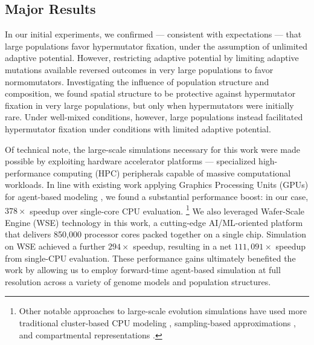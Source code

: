 \subsection{Major Results}

In our initial experiments, we confirmed --- consistent with expectations --- that large populations favor hypermutator fixation, under the assumption of unlimited adaptive potential.
However, restricting adaptive potential by limiting adaptive mutations available reversed outcomes in very large populations to favor normomutators.
Investigating the influence of population structure and composition, we found spatial structure to be protective against hypermutator fixation in very large populations, but only when hypermutators were initially rare.
Under well-mixed conditions, however, large populations instead facilitated hypermutator fixation under conditions with limited adaptive potential.

Of technical note, the large-scale simulations necessary for this work were made possible by exploiting hardware accelerator platforms --- specialized high-performance computing (HPC) peripherals capable of massive computational workloads.
In line with existing work applying Graphics Processing Units (GPUs) for agent-based modeling \citep{turpin2021xaevol,kosiachenko2019mass,perumalla2009switching,heinemann2007artificial,richmond2023flame}, we found a substantial performance boost: in our case, $378\times$ speedup over single-core CPU evaluation.
\footnote{%
Other notable approaches to large-scale evolution simulations have used more traditional cluster-based CPU modeling \citep{moreno2022best,collier2015large,ray1995proposal,turpin2020paevol}, sampling-based approximations \citep{taddei1997role}, and compartmental representations \citep{tenaillon1999mutators}.}
We also leveraged Wafer-Scale Engine (WSE) technology in this work, a cutting-edge AI/ML-oriented platform that delivers 850,000 processor cores packed together on a single chip.
Simulation on WSE achieved a further $294\times$ speedup, resulting in a net $111{,}091\times$ speedup from single-CPU evaluation.
These performance gains ultimately benefited the work by allowing us to employ forward-time agent-based simulation at full resolution across a variety of genome models and population structures.
